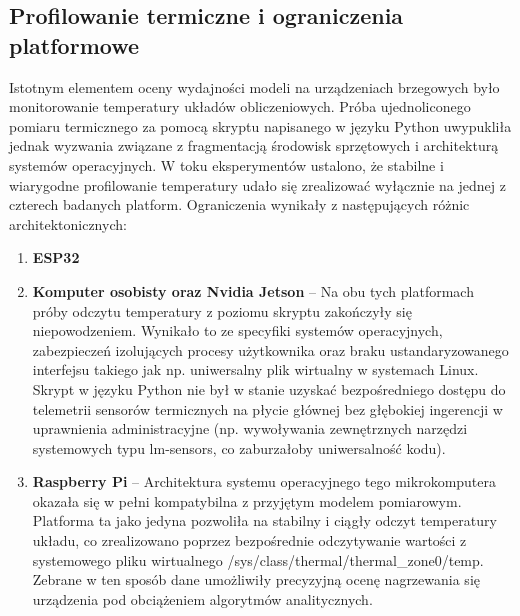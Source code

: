 \documentclass[12pt,twoside]{article}
\begin{document}
\subsection{Profilowanie termiczne i ograniczenia platformowe}
Istotnym elementem oceny wydajności modeli na urządzeniach brzegowych było monitorowanie temperatury układów obliczeniowych. Próba ujednoliconego pomiaru termicznego za pomocą skryptu napisanego w języku Python uwypukliła jednak wyzwania związane z fragmentacją środowisk sprzętowych i architekturą systemów operacyjnych. W toku eksperymentów ustalono, że stabilne i wiarygodne profilowanie temperatury udało się zrealizować wyłącznie na jednej z czterech badanych platform. Ograniczenia wynikały z następujących różnic architektonicznych:
\begin{enumerate}[label=\alph*), leftmargin=1.25cm]
\item \textbf{ESP32}
\item \textbf{Komputer osobisty oraz Nvidia Jetson} -- Na obu tych platformach próby odczytu temperatury z poziomu skryptu zakończyły się niepowodzeniem. Wynikało to ze specyfiki systemów operacyjnych, zabezpieczeń izolujących procesy użytkownika oraz braku ustandaryzowanego interfejsu takiego jak np. uniwersalny plik wirtualny w systemach Linux. Skrypt w języku Python nie był w stanie uzyskać bezpośredniego dostępu do telemetrii sensorów termicznych na płycie głównej bez głębokiej ingerencji w uprawnienia administracyjne (np. wywoływania zewnętrznych narzędzi systemowych typu lm-sensors, co zaburzałoby uniwersalność kodu).
\item \textbf{Raspberry Pi} -- Architektura systemu operacyjnego tego mikrokomputera okazała się w pełni kompatybilna z przyjętym modelem pomiarowym. Platforma ta jako jedyna pozwoliła na stabilny i ciągły odczyt temperatury układu, co zrealizowano poprzez bezpośrednie odczytywanie wartości z systemowego pliku wirtualnego /sys/class/thermal/thermal\_zone0/temp. Zebrane w ten sposób dane umożliwiły precyzyjną ocenę nagrzewania się urządzenia pod obciążeniem algorytmów analitycznych.
\end{enumerate}
\end{document}
